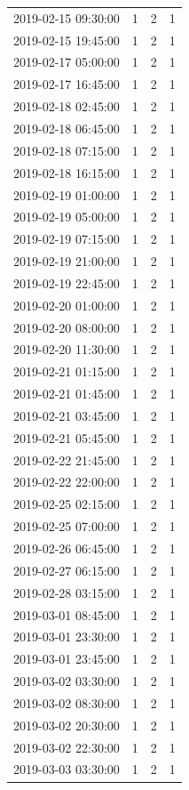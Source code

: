 \begin{tabular}{lrrr}
2019-02-15 09:30:00 & 1 & 2 & 1 \\
2019-02-15 19:45:00 & 1 & 2 & 1 \\
2019-02-17 05:00:00 & 1 & 2 & 1 \\
2019-02-17 16:45:00 & 1 & 2 & 1 \\
2019-02-18 02:45:00 & 1 & 2 & 1 \\
2019-02-18 06:45:00 & 1 & 2 & 1 \\
2019-02-18 07:15:00 & 1 & 2 & 1 \\
2019-02-18 16:15:00 & 1 & 2 & 1 \\
2019-02-19 01:00:00 & 1 & 2 & 1 \\
2019-02-19 05:00:00 & 1 & 2 & 1 \\
2019-02-19 07:15:00 & 1 & 2 & 1 \\
2019-02-19 21:00:00 & 1 & 2 & 1 \\
2019-02-19 22:45:00 & 1 & 2 & 1 \\
2019-02-20 01:00:00 & 1 & 2 & 1 \\
2019-02-20 08:00:00 & 1 & 2 & 1 \\
2019-02-20 11:30:00 & 1 & 2 & 1 \\
2019-02-21 01:15:00 & 1 & 2 & 1 \\
2019-02-21 01:45:00 & 1 & 2 & 1 \\
2019-02-21 03:45:00 & 1 & 2 & 1 \\
2019-02-21 05:45:00 & 1 & 2 & 1 \\
2019-02-22 21:45:00 & 1 & 2 & 1 \\
2019-02-22 22:00:00 & 1 & 2 & 1 \\
2019-02-25 02:15:00 & 1 & 2 & 1 \\
2019-02-25 07:00:00 & 1 & 2 & 1 \\
2019-02-26 06:45:00 & 1 & 2 & 1 \\
2019-02-27 06:15:00 & 1 & 2 & 1 \\
2019-02-28 03:15:00 & 1 & 2 & 1 \\
2019-03-01 08:45:00 & 1 & 2 & 1 \\
2019-03-01 23:30:00 & 1 & 2 & 1 \\
2019-03-01 23:45:00 & 1 & 2 & 1 \\
2019-03-02 03:30:00 & 1 & 2 & 1 \\
2019-03-02 08:30:00 & 1 & 2 & 1 \\
2019-03-02 20:30:00 & 1 & 2 & 1 \\
2019-03-02 22:30:00 & 1 & 2 & 1 \\
2019-03-03 03:30:00 & 1 & 2 & 1 \\

\end{tabular}
